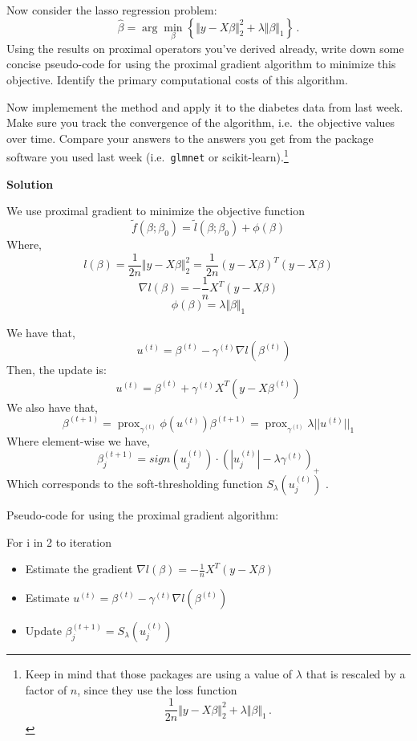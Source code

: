 \documentclass[11 pt]{article}
\newcommand{\prox}{ \mathop{\mathrm{prox}} }
\newcommand{\enorm}[1]{\Vert #1 \Vert_2}
\begin{document}
\begin{enumerate}[label=(\Alph*)]
	Now consider the lasso regression problem:
	$$
	\hat{\beta} = \arg \min_{\beta} \left\{  \enorm{y - X\beta}^2 + \lambda \Vert \beta \Vert_1 \right\} \, .
	$$
	Using the results on proximal operators you've derived already, write down some concise pseudo-code for using the proximal gradient algorithm to minimize this objective.  Identify the primary computational costs of this algorithm.
	
	Now implemement the method and apply it to the diabetes data from last week.  Make sure you track the convergence of the algorithm, i.e.~the objective values over time.  Compare your answers to the answers you get from the package software you used last week (i.e.~\verb|glmnet| or scikit-learn).\footnote{Keep in mind that those packages are using a value of $\lambda$ that is rescaled by a factor of $n$, since they use the loss function
		$$
		\frac{1}{2n} \enorm{y - X\beta}^2  + \lambda \Vert \beta \Vert_1 \, .
		$$
	}
	
	\vspace{2mm}
	\textbf{Solution}
	
	We use proximal gradient to minimize the objective function 
	$$
	\tilde{f}(\beta; \beta_0) = \tilde{l}(\beta; \beta_0) + \phi(\beta) 
	$$
	Where,
	$$
	l(\beta) = \frac{1}{2n} \enorm{y - X\beta}^2 = \frac{1}{2n} (y-X\beta)^T(y-X\beta)$$
	$$
	\nabla l(\beta) = -\frac{1}{n}X^T(y-X\beta)
	$$
	$$
	\phi(\beta) = \lambda \Vert \beta \Vert_1
	$$ 
	
	We have that,
	$$
	\quad u^{(t)} = \beta^{(t)} - \gamma^{(t)} \nabla l(\beta^{(t)}) 
	$$
		Then, the update is:
	$$
	u^{(t)} = \beta^{(t)} + \gamma^{(t)}X^T(y - X\beta^{(t)}) 
	$$
	We also have that,
	$$
	\beta^{(t+1)} = \prox_{\gamma^{(t)}} \phi(u^{(t)}) 
	\beta^{(t+1)} = \prox_{\gamma^{(t)}} \lambda ||u^{(t)}||_1 $$
	Where element-wise we have, $$
	\beta^{(t+1)}_j = sign(u_j^{(t)}) \cdot (|u^{(t)}_j| - \lambda\gamma^{(t)})_+ $$
	Which corresponds to the soft-thresholding function $S_\lambda(u^{(t)}_j)$  .


	
	\newpage
	Pseudo-code for using the proximal gradient algorithm: \\
	\vspace{2mm}
	
	For i in 2 to iteration
	\begin{itemize}
		\item Estimate the gradient $ \nabla l(\beta) = -\frac{1}{n}X^T(y-X\beta) $
		\item Estimate $ u^{(t)} = \beta^{(t)} - \gamma^{(t)} \nabla l(\beta^{(t)}) $
		\item Update $ 	\beta^{(t+1)}_j = S_\lambda(u^{(t)}_j)$
	\end{itemize}
	

\end{enumerate}
\end{document}
